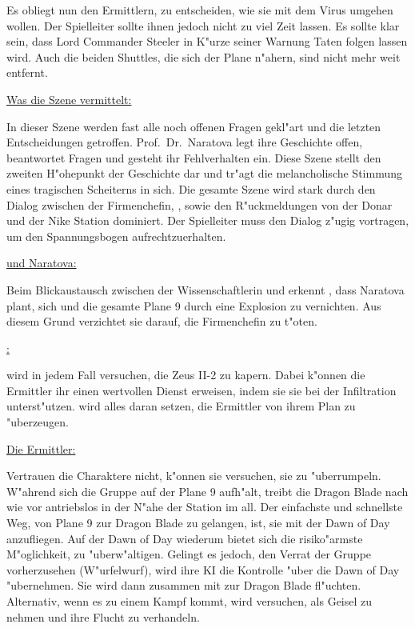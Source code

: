 Es obliegt nun den Ermittlern, zu entscheiden, wie sie mit dem Virus umgehen wollen. Der Spielleiter sollte ihnen jedoch nicht zu viel Zeit lassen. Es sollte klar sein, dass Lord Commander Steeler in K"urze seiner Warnung Taten folgen lassen wird. Auch die beiden Shuttles, die sich der Plane n"ahern, sind nicht mehr weit entfernt.

\vfill
\newpage

\begin{remarks}
	\underline{Was die Szene vermittelt:}

	In dieser Szene werden fast alle noch offenen Fragen gekl"art und die letzten Entscheidungen getroffen. Prof.~Dr.~Naratova legt ihre Geschichte offen, beantwortet Fragen und gesteht ihr Fehlverhalten ein. Diese Szene stellt den zweiten H"ohepunkt der Geschichte dar und tr"agt die melancholische Stimmung eines tragischen Scheiterns in sich. Die gesamte Szene wird stark durch den Dialog zwischen der Firmenchefin, \xl{}, \ml{} sowie den R"uckmeldungen von der Donar und der Nike Station dominiert. Der Spielleiter muss den Dialog z"ugig vortragen, um den Spannungsbogen aufrechtzuerhalten.

	\underline{\xl{} und Naratova:}

	Beim Blickaustausch zwischen der Wissenschaftlerin und \xl{} erkennt \xl{}, dass Naratova plant, sich und die gesamte Plane 9 durch eine Explosion zu vernichten. Aus diesem Grund verzichtet sie darauf, die Firmenchefin zu t"oten.

	\underline{\xl{}:}

	\xl{} wird in jedem Fall versuchen, die Zeus II-2 zu kapern. Dabei k"onnen die Ermittler ihr einen wertvollen Dienst erweisen, indem sie sie bei der Infiltration unterst"utzen. \xl{} wird alles daran setzen, die Ermittler von ihrem Plan zu "uberzeugen.
	
	\underline{Die Ermittler:}
	
	Vertrauen die Charaktere \xl{} nicht, k"onnen sie versuchen, sie zu "uberrumpeln. W"ahrend sich die Gruppe auf der Plane 9 aufh"alt, treibt die Dragon Blade nach wie vor antriebslos in der N"ahe der Station im all. Der einfachste und schnellste Weg, von Plane 9 zur Dragon Blade zu gelangen, ist, sie mit der Dawn of Day anzufliegen. Auf der Dawn of Day wiederum bietet sich die risiko"armste M"oglichkeit, \xl{} zu "uberw"altigen. Gelingt es \xl{} jedoch, den Verrat der Gruppe vorherzusehen (W"urfelwurf), wird ihre KI die Kontrolle "uber die Dawn of Day "ubernehmen. Sie wird dann zusammen mit \ml{} zur Dragon Blade fl"uchten. Alternativ, wenn es zu einem Kampf kommt, wird \xl{} versuchen, \ml{} als Geisel zu nehmen und ihre Flucht zu verhandeln.
\end{remarks}

